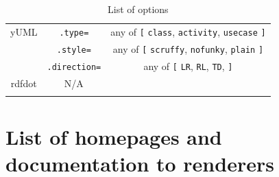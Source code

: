 \documentclass[]{article}
\begin{document}
\begin{longtable}[c]{@{}ccc@{}}
\begin{minipage}[t]{0.28\columnwidth}\centering
yUML
\end{minipage} & \begin{minipage}[t]{0.33\columnwidth}\centering
\texttt{.type=}
\end{minipage} & \begin{minipage}[t]{0.25\columnwidth}\centering
any of \texttt{{[}} \texttt{class}, \texttt{activity}, \texttt{usecase}
\texttt{{]}}
\end{minipage}
\\\addlinespace
\begin{minipage}[t]{0.28\columnwidth}\centering
\end{minipage} & \begin{minipage}[t]{0.33\columnwidth}\centering
\texttt{.style=}
\end{minipage} & \begin{minipage}[t]{0.25\columnwidth}\centering
any of \texttt{{[}} \texttt{scruffy}, \texttt{nofunky}, \texttt{plain}
\texttt{{]}}
\end{minipage}
\\\addlinespace
\begin{minipage}[t]{0.28\columnwidth}\centering
\end{minipage} & \begin{minipage}[t]{0.33\columnwidth}\centering
\texttt{.direction=}
\end{minipage} & \begin{minipage}[t]{0.25\columnwidth}\centering
any of \texttt{{[}} \texttt{LR}, \texttt{RL}, \texttt{TD}, \texttt{{]}}
\end{minipage}
\\\addlinespace
\begin{minipage}[t]{0.28\columnwidth}\centering
rdfdot
\end{minipage} & \begin{minipage}[t]{0.33\columnwidth}\centering
N/A
\end{minipage} & \begin{minipage}[t]{0.25\columnwidth}\centering
\end{minipage}
\\\addlinespace
\bottomrule
\addlinespace
\caption{List of options}
\end{longtable}

\newpage

\section{List of homepages and documentation to
renderers}\label{list-of-homepages-and-documentation-to-renderers}
\end{document}
